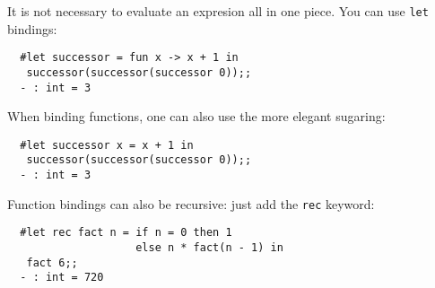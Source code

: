 \begin{slide*}


\vspace*{0.5cm}

It is not necessary to evaluate an expresion all in one piece. You can use
{\black \tt let} bindings:

\begin{black}
\begin{verbatim}
  #let successor = fun x -> x + 1 in
   successor(successor(successor 0));;
  - : int = 3
\end{verbatim}
\end{black}

When binding functions, one can also use the more elegant sugaring:

\begin{black}
\begin{verbatim}
  #let successor x = x + 1 in
   successor(successor(successor 0));;
  - : int = 3
\end{verbatim}
\end{black}

Function bindings can also be recursive: just add the {\black \tt rec} keyword:

\begin{black}
\begin{verbatim}
  #let rec fact n = if n = 0 then 1
                    else n * fact(n - 1) in
   fact 6;;
  - : int = 720
\end{verbatim}
\end{black}

\end{slide*}



